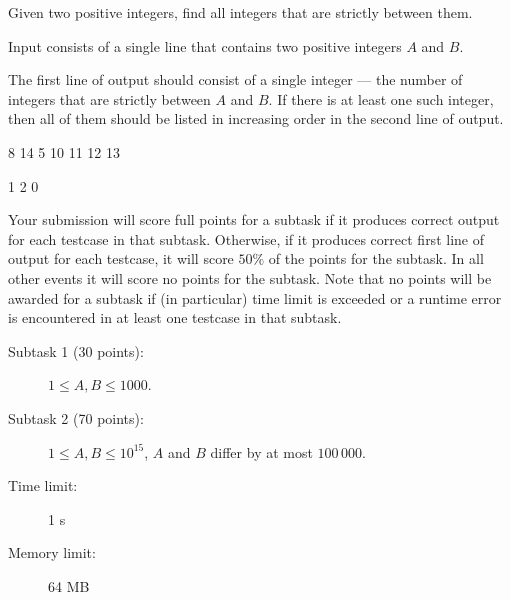 \documentclass{boi2014}
\begin{document}
    Given two positive integers, find all integers that are strictly
    between them.

    \Input
    Input consists of a single line that contains two positive
    integers $A$ and $B$.

    \Output
    The first line of output should consist of a single integer ---
    the number of integers that are strictly between $A$ and $B$.
    If there is at least one such integer, then all of them should
    be listed in increasing order in the second line of output.
    
    \Examples

    \simpleexample
    {
        8 14
    }
    {
        5  10 11 12 13
    }

    \simpleexample
    {
        1 2
    }
    {
        0
    }

    \Scoring

        Your submission will score full points for a subtask if it
        produces correct output for each testcase in 
        that subtask. Otherwise, if it produces correct first
        line of output for each testcase, it will score $50\%$ of the
        points for the subtask. In all other events it will score no
        points for the subtask.
        Note that no points will be awarded for a subtask if
        (in particular) time
        limit is exceeded or a runtime error is encountered in at
        least one testcase in that subtask.

    \begin{description}

        \item[Subtask 1 (30 points):] $1 \le A, B \le 1000$. 
        \item[Subtask 2 (70 points):] $1 \le A, B \le 10^{15}$,
            $A$ and $B$ differ by at most $100\,000$.
    \end{description}

    \Constraints

    \begin{description}
        \item[Time limit:] 1 s
        \item[Memory limit:] 64 MB
    \end{description}
\end{document}
